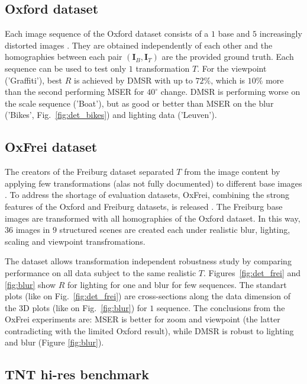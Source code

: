 \documentclass{article}
\def\I{{\mathbf I}}
\begin{document}
\subsection{Oxford dataset}
\label{ssec:oxford}
Each image sequence of the Oxford dataset consists of a $1$ base and $5$ increasingly distorted images \cite{Mikolajczyk:2005}. They are obtained independently of each other and the homographies between each pair $(\I_B,\I_T)$ are the provided  ground truth. Each sequence can be used to test only $1$ transformation $T$.
For the viewpoint ('Graffiti'), best $R$ is achieved by DMSR with up to $72\%$, which is $10\%$ more than the second performing MSER for $40^{\circ}$ change. DMSR is performing worse on the scale sequence ('Boat'), but as good or better than MSER on the blur ('Bikes', Fig.~\ref{fig:det_bikes}) and lighting data ('Leuven').

\subsection{OxFrei dataset}
\label{ssec:combined}
The creators of the Freiburg dataset separated $T$ from the image content by applying few transformations (alas not fully documented) to different base images \cite{FischerDB14}. To address the shortage of evaluation datasets, OxFrei, combining the strong features of the Oxford and Freiburg datasets, is released \cite{Rang:dataset}. The Freiburg base images are transformed with all homographies of the Oxford dataset. In this way, $36$ images in $9$ structured scenes are created each under realistic blur, lighting, scaling and viewpoint transfromations.

The dataset allows transformation independent robustness study by comparing performance on all data subject to the same realistic $T$. Figures~\ref{fig:det_frei} and \ref{fig:blur} show $R$ for lighting for one and blur for few sequences. The standart plots (like on Fig.~\ref{fig:det_frei}) are cross-sections along the data dimension of the 3D plots (like on Fig.~\ref{fig:blur}) for $1$ sequence. The conclusions from the OxFrei experiments are: MSER is better for zoom and viewpoint (the latter contradicting with the limited Oxford result), while DMSR is robust to lighting and blur (Figure \ref{fig:blur}).

\subsection{TNT hi-res benchmark}
\label{ssec:tnt}
\end{document}
